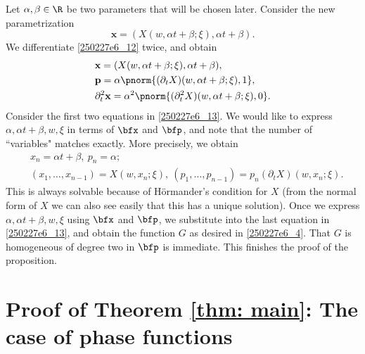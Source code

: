 \documentclass{article}
\numberwithin{equation}{section}
\theoremstyle{plain}
\begin{document}
Let $\alpha, \beta\in \R$ be two parameters that will be chosen later. Consider the new parametrization 
\begin{equation}\label{250227e6_12}
\mathbf{x}= (X(w, \alpha t+\beta; \xi), \alpha t+\beta).
\end{equation}
We differentiate \eqref{250227e6_12} twice, and obtain 
\begin{equation}\label{250227e6_13}
\begin{split}
& \mathbf{x}= (X(w, \alpha t+\beta; \xi), \alpha t+\beta),\\
& \mathbf{p}= \alpha\pnorm{(\partial_t X)(
w, \alpha t+\beta; \xi
), 1
}, \\
& \partial_t^2 \mathbf{x}= \alpha^2 \pnorm{(\partial^2_t X)(
w, \alpha t+\beta; \xi
), 0
}. 
\end{split}
\end{equation}
Consider the first two equations in \eqref{250227e6_13}. We would like to express $\alpha, \alpha t+\beta, w, \xi$ in terms of $\bfx$ and $\bfp$, and note that the number of ``variables" matches exactly. More precisely, we obtain 
\begin{equation}
\begin{split}
& x_n= \alpha t+\beta, \ p_n= \alpha;\\
& (x_1, \dots, x_{n-1})= X(w, x_n; \xi), \ (p_1, \dots, p_{n-1})= p_n (\partial_t X)(
w, x_n; \xi
).
\end{split}
\end{equation}
This is always solvable because of H\"ormander's condition for $X$ (from the normal form of $X$ we can also see easily that this has a unique solution). Once we express $\alpha, \alpha t+\beta, w, \xi$ using $\bfx$ and $\bfp$, we substitute into the last equation in \eqref{250227e6_13}, and obtain the function $G$ as desired in \eqref{250227e6_4}. That $G$ is homogeneous of degree two in $\bfp$ is immediate. This finishes the proof of the proposition. 















\section{Proof of Theorem \ref{thm: main}: The case of phase functions}
\end{document}
